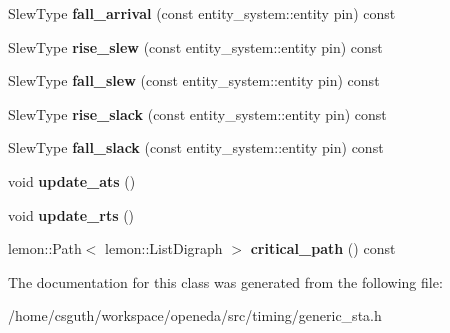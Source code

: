\begin{DoxyCompactItemize}
\item 
\hypertarget{classophidian_1_1timing_1_1generic__sta_a9a9be0dd6f4c571230f368d3cf694309}{Slew\-Type {\bfseries fall\-\_\-arrival} (const entity\-\_\-system\-::entity pin) const }\label{classophidian_1_1timing_1_1generic__sta_a9a9be0dd6f4c571230f368d3cf694309}

\item 
\hypertarget{classophidian_1_1timing_1_1generic__sta_a1a3183e783b1eded8c9394569452d18b}{Slew\-Type {\bfseries rise\-\_\-slew} (const entity\-\_\-system\-::entity pin) const }\label{classophidian_1_1timing_1_1generic__sta_a1a3183e783b1eded8c9394569452d18b}

\item 
\hypertarget{classophidian_1_1timing_1_1generic__sta_a60a4707440379348f29755aff12d953d}{Slew\-Type {\bfseries fall\-\_\-slew} (const entity\-\_\-system\-::entity pin) const }\label{classophidian_1_1timing_1_1generic__sta_a60a4707440379348f29755aff12d953d}

\item 
\hypertarget{classophidian_1_1timing_1_1generic__sta_a2a59784a6789ee7bf471362c839f5601}{Slew\-Type {\bfseries rise\-\_\-slack} (const entity\-\_\-system\-::entity pin) const }\label{classophidian_1_1timing_1_1generic__sta_a2a59784a6789ee7bf471362c839f5601}

\item 
\hypertarget{classophidian_1_1timing_1_1generic__sta_ad4a35e33ab77c4e4d536f3091657816a}{Slew\-Type {\bfseries fall\-\_\-slack} (const entity\-\_\-system\-::entity pin) const }\label{classophidian_1_1timing_1_1generic__sta_ad4a35e33ab77c4e4d536f3091657816a}

\item 
\hypertarget{classophidian_1_1timing_1_1generic__sta_ae9cf6c1e7fdcc7231f50a80bc51fc763}{void {\bfseries update\-\_\-ats} ()}\label{classophidian_1_1timing_1_1generic__sta_ae9cf6c1e7fdcc7231f50a80bc51fc763}

\item 
\hypertarget{classophidian_1_1timing_1_1generic__sta_a72cd9fcb49e2690b491dcbaae360a200}{void {\bfseries update\-\_\-rts} ()}\label{classophidian_1_1timing_1_1generic__sta_a72cd9fcb49e2690b491dcbaae360a200}

\item 
\hypertarget{classophidian_1_1timing_1_1generic__sta_ad242c042ed3fd20ac2365f8fe6d73ad3}{lemon\-::\-Path$<$ lemon\-::\-List\-Digraph $>$ {\bfseries critical\-\_\-path} () const }\label{classophidian_1_1timing_1_1generic__sta_ad242c042ed3fd20ac2365f8fe6d73ad3}

\end{DoxyCompactItemize}


The documentation for this class was generated from the following file\-:\begin{DoxyCompactItemize}
\item 
/home/csguth/workspace/openeda/src/timing/generic\-\_\-sta.\-h\end{DoxyCompactItemize}
